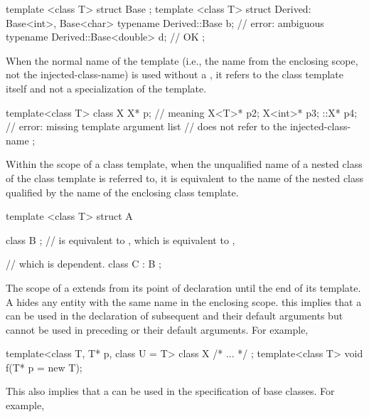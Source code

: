 \begin{codeblock}
template <class T> struct Base { };
template <class T> struct Derived: Base<int>, Base<char> {
    typename Derived::Base b;           // error: ambiguous
    typename Derived::Base<double> d;   // OK
};
\end{codeblock}
\exitexampleb

\pnumalt
When the normal name of the template (i.e., the name from
the enclosing scope, not the injected-class-name) is
used without a ,
it refers to the class template itself and not a
specialization of the template.
\enterexample

\begin{codeblock}
template<class T> class X {
    X* p;			// meaning 
    X<T>* p2;
    X<int>* p3;
    ::X* p4;			// error: missing template argument list
				//  does not refer to the injected-class-name
};
\end{codeblock}
\exitexampleb

\pnumalt
Within the scope of a class template, when the unqualified name of a nested
class of the class template is referred to, it is equivalent to the name of
the nested class qualified by the name of the enclosing class template.
\enterexample

\begin{codeblock}
template <class T> struct A {
    class B { };		//  is equivalent to , which is equivalent to ,

				// which is dependent.
    class C : B { };
}
\end{codeblock}

\exitexampleb

\pnum
The scope of a  extends from its point of
declaration until the end of its template. A 
hides any entity with the same name in the enclosing scope.
\enternote this implies that a  can be used
in the declaration of subsequent  and
their default arguments but cannot be used in preceding
 or their default arguments.
For example,

\begin{codeblock}
template<class T, T* p, class U = T> class X { /* ... */ };
template<class T> void f(T* p = new T);
\end{codeblock}

This also implies that a  can be used in
the specification of base classes. For example,

